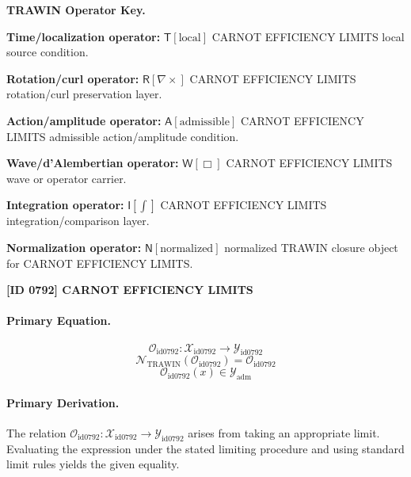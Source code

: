 \par\vspace{0.45\baselineskip}
\noindent\begin{minipage}[t]{\linewidth}
\begingroup
\small
\raggedright
\textbf{TRAWIN Operator Key.}\par
\noindent\textbf{Time/localization operator:} $\mathsf{T}\!\left[\mathrm{local}\right]$ CARNOT EFFICIENCY LIMITS local source condition.\par
\noindent\textbf{Rotation/curl operator:} $\mathsf{R}\!\left[\nabla\times\right]$ CARNOT EFFICIENCY LIMITS rotation/curl preservation layer.\par
\noindent\textbf{Action/amplitude operator:} $\mathsf{A}\!\left[\mathrm{admissible}\right]$ CARNOT EFFICIENCY LIMITS admissible action/amplitude condition.\par
\noindent\textbf{Wave/d'Alembertian operator:} $\mathsf{W}\!\left[\Box\right]$ CARNOT EFFICIENCY LIMITS wave or operator carrier.\par
\noindent\textbf{Integration operator:} $\mathsf{I}\!\left[\int\right]$ CARNOT EFFICIENCY LIMITS integration/comparison layer.\par
\noindent\textbf{Normalization operator:} $\mathsf{N}\!\left[\mathrm{normalized}\right]$ normalized TRAWIN closure object for CARNOT EFFICIENCY LIMITS.\par
\endgroup
\end{minipage}

\clearpage
\noindent\textbf{[ID 0792] CARNOT EFFICIENCY LIMITS}\par
\vspace{0.35em}
\paragraph{Primary Equation.}
\[
\mathcal{O}_{\mathrm{id0792}}:\mathcal{X}_{\mathrm{id0792}}\longrightarrow\mathcal{Y}_{\mathrm{id0792}}
\]
\[
\mathcal{N}_{\mathrm{TRAWIN}}(\mathcal{O}_{\mathrm{id0792}})=\mathcal{O}_{\mathrm{id0792}}
\]
\[
\mathcal{O}_{\mathrm{id0792}}(x)\in\mathcal{Y}_{\mathrm{adm}}
\]

\paragraph{Primary Derivation.}
The relation \( \mathcal{O}_{\mathrm{id0792}}:\mathcal{X}_{\mathrm{id0792}}\longrightarrow\mathcal{Y}_{\mathrm{id0792}} \) arises from taking an appropriate limit. Evaluating the expression under the stated limiting procedure and using standard limit rules yields the given equality.
